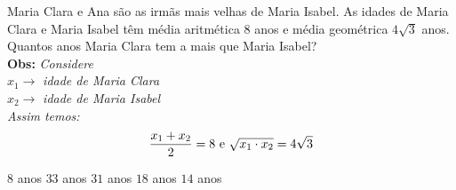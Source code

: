 Maria Clara e Ana são as irmãs mais velhas de Maria Isabel. As idades de Maria Clara e Maria Isabel têm média aritmética $8$ anos e média geométrica $4\sqrt{3}$ anos. Quantos anos Maria Clara tem a mais que Maria Isabel?\\
{\bf Obs: }{\it Considere}\\
$x_1\rightarrow$ {\it idade de Maria Clara}\\
$x_2\rightarrow$ {\it idade de Maria Isabel}\\
{\it Assim temos:}\\
\[\dfrac{x_1+x_2}{2}=8\textnormal{\,\,e\,\,}\sqrt{x_1\cdot x_2}=4\sqrt{3} \]

$8$ anos
$33$ anos
$31$ anos
$18$ anos
$14$ anos



